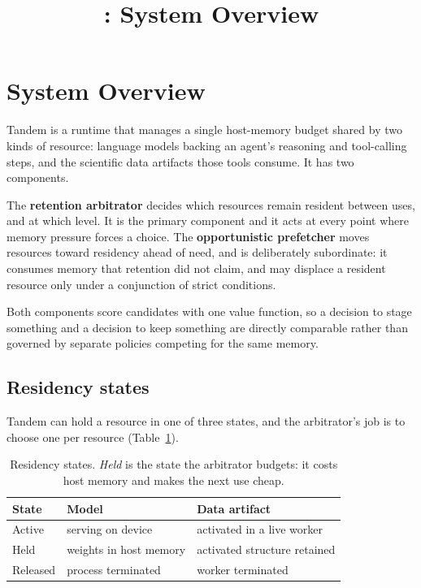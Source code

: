 \documentclass[10pt,twocolumn]{article}
\title{\sysname: System Overview}
\date{}
\newcommand{\sysname}{Tandem\xspace}   %
\begin{document}
\maketitle

\section{System Overview}

\sysname is a runtime that manages a single host-memory budget shared by two
kinds of resource: language models backing an agent's reasoning and
tool-calling steps, and the scientific data artifacts those tools consume.
It has two components.

The \textbf{retention arbitrator} decides which resources remain resident
between uses, and at which level. It is the primary component and it acts at
every point where memory pressure forces a choice. The
\textbf{opportunistic prefetcher} moves resources toward residency ahead of
need, and is deliberately subordinate: it consumes memory that retention did
not claim, and may displace a resident resource only under a conjunction of
strict conditions.

Both components score candidates with one value function, so a decision to
stage something and a decision to keep something are directly comparable
rather than governed by separate policies competing for the same memory.

\subsection{Residency states}

\sysname can hold a resource in one of three states, and the arbitrator's job
is to choose one per resource (Table~\ref{tab:states}).

\begin{table}[t]
\centering\small
\begin{tabular}{@{}lll@{}}
\toprule
State & Model & Data artifact \\
\midrule
Active   & serving on device      & activated in a live worker \\
Held     & weights in host memory & activated structure retained \\
Released & process terminated     & worker terminated \\
\bottomrule
\end{tabular}
\caption{Residency states. \emph{Held} is the state the arbitrator budgets:
it costs host memory and makes the next use cheap.}
\label{tab:states}
\end{table}
\end{document}

